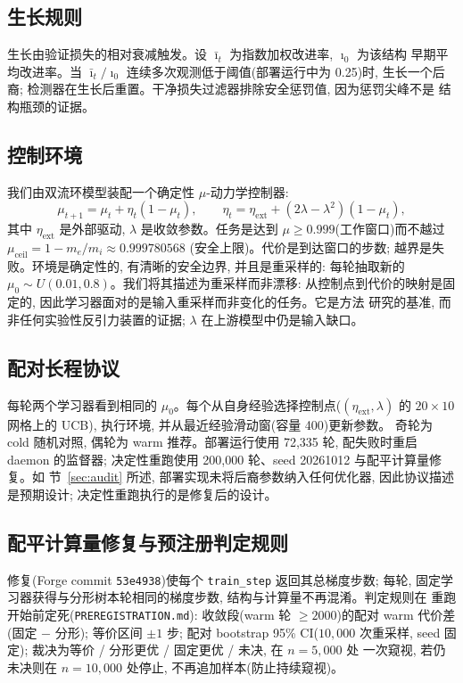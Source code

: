 \documentclass[11pt]{article}
\begin{document}
\subsection{生长规则}

生长由验证损失的相对衰减触发。设 $\bar\imath_t$ 为指数加权改进率, $\imath_0$ 为该结构
早期平均改进率。当 $\bar\imath_t/\imath_0$ 连续多次观测低于阈值(部署运行中为 0.25)时,
生长一个后裔; 检测器在生长后重置。干净损失过滤器排除安全惩罚值, 因为惩罚尖峰不是
结构瓶颈的证据。

\subsection{控制环境}

我们由双流环模型装配一个确定性 $\mu$-动力学控制器:
\begin{equation}
 \mu_{t+1}=\mu_t+\eta_t(1-\mu_t),
 \qquad
 \eta_t=\eta_{\mathrm{ext}}+(2\lambda-\lambda^2)(1-\mu_t),
\end{equation}
其中 $\eta_{\mathrm{ext}}$ 是外部驱动, $\lambda$ 是收敛参数。任务是达到
$\mu\ge 0.999$(工作窗口)而不越过 $\mu_{\mathrm{ceil}}=1-m_e/m_i\approx0.999780568$
(安全上限)。代价是到达窗口的步数; 越界是失败。环境是确定性的, 有清晰的安全边界,
并且是重采样的: 每轮抽取新的 $\mu_0\sim U(0.01,0.8)$。我们将其描述为重采样而非漂移:
从控制点到代价的映射是固定的, 因此学习器面对的是输入重采样而非变化的任务。它是方法
研究的基准, 而非任何实验性反引力装置的证据; $\lambda$ 在上游模型中仍是输入缺口。

\subsection{配对长程协议}

每轮两个学习器看到相同的 $\mu_0$。每个从自身经验选择控制点($(\eta_{\mathrm{ext}},\lambda)$
的 $20\times10$ 网格上的 UCB), 执行环境, 并从最近经验滑动窗(容量 400)更新参数。
奇轮为 cold 随机对照, 偶轮为 warm 推荐。部署运行使用 72,335 轮, 配失败时重启 daemon
的监督器; 决定性重跑使用 200,000 轮、seed 20261012 与配平计算量修复。如
节~\ref{sec:audit} 所述, 部署实现未将后裔参数纳入任何优化器, 因此协议描述是预期设计;
决定性重跑执行的是修复后的设计。

\subsection{配平计算量修复与预注册判定规则}

修复(Forge commit \texttt{53e4938})使每个 \texttt{train\_step} 返回其总梯度步数;
每轮, 固定学习器获得与分形树本轮相同的梯度步数, 结构与计算量不再混淆。判定规则在
重跑开始前定死(\texttt{PREREGISTRATION.md}): 收敛段(warm 轮 $\ge 2000$)的配对
warm 代价差(固定 $-$ 分形); 等价区间 $\pm 1$ 步; 配对 bootstrap 95\% CI($10{,}000$
次重采样, seed 固定); 裁决为等价 / 分形更优 / 固定更优 / 未决, 在 $n=5{,}000$ 处
一次窥视, 若仍未决则在 $n=10{,}000$ 处停止, 不再追加样本(防止持续窥视)。
\end{document}
